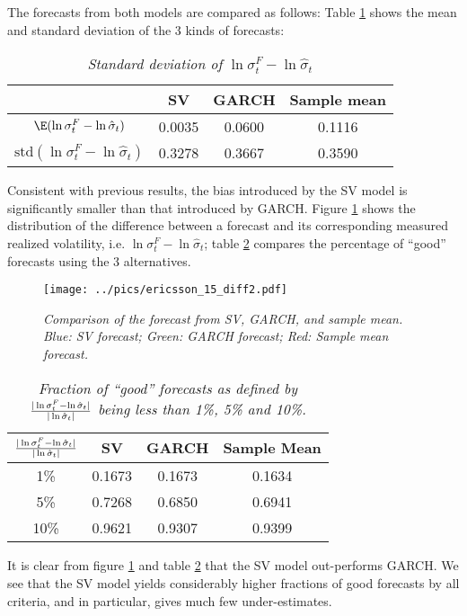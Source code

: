 The forecasts from both models are compared as follows: Table
\ref{tab:ericsson_15_diff1} shows the mean and standard deviation of
the 3 kinds of forecasts:
\begin{table}[htb!]
  \centering
  \begin{tabular}{|c|c|c|c|}
    \hline
    & SV & GARCH & Sample mean \\
    \hline
    $\E(\ln \sigma^F_t - \ln \hat{\sigma}_t)$ & 0.0035 &
    0.0600 & 0.1116 \\
    \hline
    $\text{std}(\ln \sigma^F_t - \ln \hat{\sigma}_t)$ & 0.3278 &
    0.3667 & 0.3590 \\
    \hline
  \end{tabular}
  \caption{\small \it Standard deviation of $\ln\sigma^F_t -
    \ln\hat{\sigma}_t$}
  \label{tab:ericsson_15_diff1}
\end{table}
Consistent with previous results, the bias introduced by the SV model
is significantly smaller than that introduced by GARCH. Figure
\ref{fig:ericsson_15_diff2} shows the distribution of the difference
between a forecast and its corresponding measured realized volatility,
i.e. $\ln\sigma^F_t - \ln\hat{\sigma}_t$; table
\ref{tab:ericsson_15_diff3} compares the percentage of ``good''
forecasts using the 3 alternatives.
\begin{figure}[htb!]
  \centering
    \texttt{[image: ../pics/ericsson\_15\_diff2.pdf]}
  \caption{\small \it Comparison of the forecast from SV, GARCH,
    and sample mean. Blue: SV forecast; Green: GARCH forecast; Red:
    Sample mean forecast.}
  \label{fig:ericsson_15_diff2}
\end{figure}

\begin{table}[htb!]
  \centering
  \begin{tabular}{|c|c|c|c|}
    \hline
    ${|\ln \sigma^F_t - \ln \hat{\sigma}_t| \over |\ln
      \hat{\sigma}_t|}$ &
    SV & GARCH & Sample Mean \\
    \hline
    1\% & 0.1673 & 0.1673 & 0.1634 \\
    \hline
    5\% & 0.7268 & 0.6850 & 0.6941 \\
    \hline
    10\% & 0.9621 & 0.9307 & 0.9399 \\
    \hline
  \end{tabular}
  \caption{\small \it Fraction of ``good'' forecasts as defined by
    ${|\ln \sigma^F_t - \ln \hat{\sigma}_t| \over |\ln
      \hat{\sigma}_t|}$ being less than 1\%, 5\% and 10\%.}
  \label{tab:ericsson_15_diff3}
\end{table}
It is clear from figure \ref{fig:ericsson_15_diff2} and table
\ref{tab:ericsson_15_diff3} that the SV model out-performs GARCH. We
see that the SV model yields considerably higher fractions of good
forecasts by all criteria, and in particular, gives much few
under-estimates.

